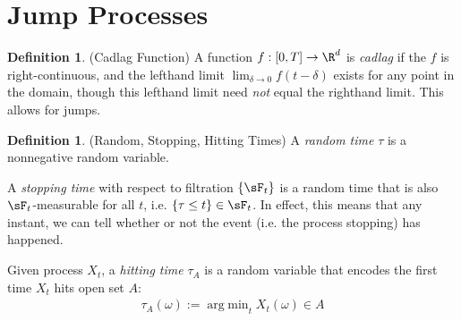 \documentclass[12pt]{article}
\theoremstyle{plain}
\theoremstyle{definition}
\newtheorem{defn}[thm]{Definition}
\theoremstyle{remark}
\newcommand{\ra}{\rightarrow}
\DeclareMathOperator*{\argmin}{arg\;min}
\begin{document}



\clearpage
\section{Jump Processes}


\begin{defn}(Cadlag Function)
A function $f:[0,T]\ra\R^d$ is \emph{cadlag} if the $f$ is
right-continuous, and the lefthand limit $\lim_{\delta \ra 0}
f(t-\delta)$ exists for any point in the domain, though this lefthand
limit need \emph{not} equal the righthand limit.
This allows for jumps.
\end{defn}
\begin{defn}(Random, Stopping, Hitting Times)
A \emph{random time} $\tau$ is a nonnegative random variable.

A \emph{stopping time} with respect to filtration $\{\sF_t\}$ is a
random time that is also $\sF_t$-measurable for all $t$, i.e.
$\{\tau\leq t\}\in\sF_t$. In effect, this means that any instant, we can
tell whether or not the event (i.e. the process stopping) has happened.

Given process $X_t$, a \emph{hitting time} $\tau_A$ is a random variable
that encodes the first time $X_t$ hits open set $A$:
\begin{align*}
  \tau_A(\omega):=\argmin_{t} X_t(\omega)\in A
\end{align*}
\end{defn}
\end{document}

